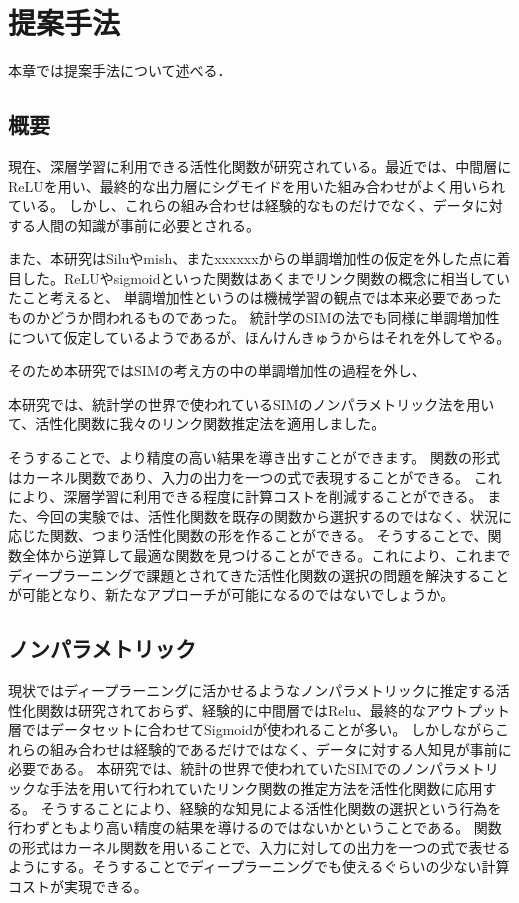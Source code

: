\chapter{提案手法}
\label{proposed}

本章では提案手法について述べる．

\section{概要}

現在、深層学習に利用できる活性化関数が研究されている。最近では、中間層にReLUを用い、最終的な出力層にシグモイドを用いた組み合わせがよく用いられている。
しかし、これらの組み合わせは経験的なものだけでなく、データに対する人間の知識が事前に必要とされる。


また、本研究はSiluやmish、またxxxxxxからの単調増加性の仮定を外した点に着目した。ReLUやsigmoidといった関数はあくまでリンク関数の概念に相当していたこと考えると、
単調増加性というのは機械学習の観点では本来必要であったものかどうか問われるものであった。
統計学のSIMの法でも同様に単調増加性について仮定しているようであるが、ほんけんきゅうからはそれを外してやる。

そのため本研究ではSIMの考え方の中の単調増加性の過程を外し、

本研究では、統計学の世界で使われているSIMのノンパラメトリック法を用いて、活性化関数に我々のリンク関数推定法を適用しました。


そうすることで、より精度の高い結果を導き出すことができます。
関数の形式はカーネル関数であり、入力の出力を一つの式で表現することができる。
これにより、深層学習に利用できる程度に計算コストを削減することができる。
また、今回の実験では、活性化関数を既存の関数から選択するのではなく、状況に応じた関数、つまり活性化関数の形を作ることができる。
そうすることで、関数全体から逆算して最適な関数を見つけることができる。これにより、これまでディープラーニングで課題とされてきた活性化関数の選択の問題を解決することが可能となり、新たなアプローチが可能になるのではないでしょうか。


\section{ノンパラメトリック}


現状ではディープラーニングに活かせるようなノンパラメトリックに推定する活性化関数は研究されておらず、経験的に中間層ではRelu、最終的なアウトプット層ではデータセットに合わせてSigmoidが使われることが多い。
しかしながらこれらの組み合わせは経験的であるだけではなく、データに対する人知見が事前に必要である。
本研究では、統計の世界で使われていたSIMでのノンパラメトリックな手法を用いて行われていたリンク関数の推定方法を活性化関数に応用する。
そうすることにより、経験的な知見による活性化関数の選択という行為を行わずともより高い精度の結果を導けるのではないかということである。
関数の形式はカーネル関数を用いることで、入力に対しての出力を一つの式で表せるようにする。そうすることでディープラーニングでも使えるぐらいの少ない計算コストが実現できる。


